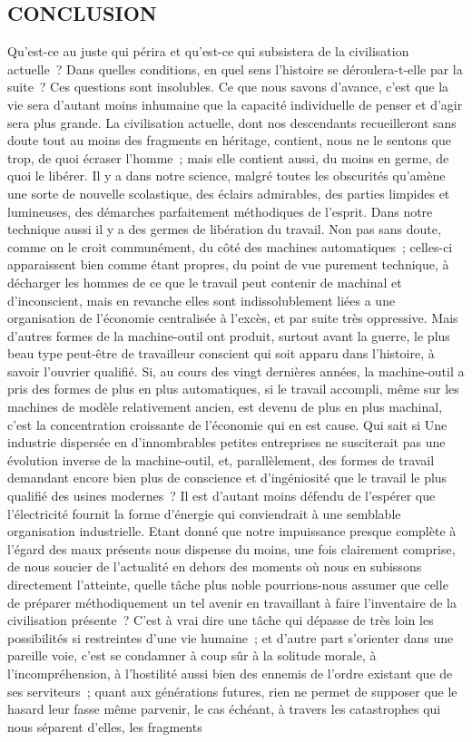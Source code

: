 \documentclass[french,twoside]{book} %
\begin{document}
\subsection[{CONCLUSION}]{CONCLUSION}
\noindent Qu'est-ce au juste qui périra et qu'est-ce qui subsistera de la civilisation actuelle ? Dans quelles conditions, en quel sens l'histoire se déroulera-t-elle par la suite ? Ces questions sont insolubles. Ce que nous savons d'avance, c'est que la vie sera d'autant moins inhumaine que la capacité individuelle de penser et d'agir sera plus grande. La civilisation actuelle, dont nos descendants recueilleront sans doute tout au moins des fragments en héritage, contient, nous ne le sentons que trop, de quoi écraser l'homme ; mais elle contient aussi, du moins en germe, de quoi le libérer. Il y a dans notre science, malgré toutes les obscurités qu'amène une sorte de nouvelle scolastique, des éclairs admirables, des parties limpides et lumineuses, des démarches parfaitement méthodiques de l'esprit. Dans notre technique aussi il y a des germes de libération du travail. Non pas sans doute, comme on le croit communément, du côté des machines automatiques ; celles-ci apparaissent bien comme étant propres, du point de vue purement technique, à décharger les hommes de ce que le travail peut contenir de machinal et d'inconscient, mais en revanche elles sont indissolublement liées a une organisation de l'économie centralisée à l'excès, et par suite très oppressive. Mais d'autres formes de la machine-outil ont produit, surtout avant la guerre, le plus beau type peut-être de travailleur conscient qui soit apparu dans l'histoire, à savoir l'ouvrier qualifié. Si, au cours des vingt dernières années, la machine-outil a pris des formes de plus en plus automatiques, si le travail accompli, même sur les machines de modèle relativement ancien, est devenu de plus en plus machinal, c'est la concentration croissante de l'économie qui en est cause. Qui sait si Une industrie dispersée en d'innombrables petites entreprises ne susciterait pas une évolution inverse de la machine-outil, et, parallèlement, des formes de travail demandant encore bien plus de conscience et d'ingéniosité que le travail le plus qualifié des usines modernes ? Il est d'autant moins défendu de l'espérer que l'électricité fournit la forme d'énergie qui conviendrait à une semblable organisation industrielle. Etant donné que notre impuissance presque complète à l'égard des maux présents nous dispense du moins, une fois clairement comprise, de nous soucier de l'actualité en dehors des moments où nous en subissons directement l'atteinte, quelle tâche plus noble pourrions-nous assumer que celle de préparer méthodiquement un tel avenir en travaillant à faire l'inventaire de la civilisation présente ? C'est à vrai dire une tâche qui dépasse de très loin les possibilités si restreintes d'une vie humaine ; et d'autre part s'orienter dans une pareille voie, c'est se condamner à coup sûr à la solitude morale, à l'incompréhension, à l'hostilité aussi bien des ennemis de l'ordre existant que de ses serviteurs ; quant aux générations futures, rien ne permet de supposer que le hasard leur fasse même parvenir, le cas échéant, à travers les catastrophes qui nous séparent d'elles, les fragments 
\end{document}

